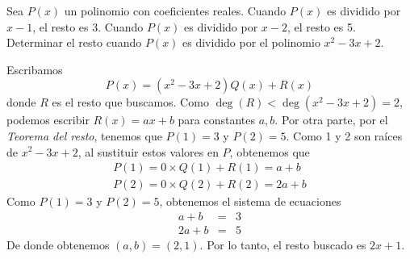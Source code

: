 \begin{section-example.tcb}
    Sea $P(x)$ un polinomio con coeficientes reales.
    Cuando $P(x)$ es dividido por $x - 1$, el resto es 3.
    Cuando $P(x)$ es dividido por $x - 2$, el resto es 5.
    Determinar el resto cuando $P(x)$ es dividido por el polinomio $x^2 - 3x + 2$.
\end{section-example.tcb}
\begin{solution}
    Escribamos
    \[
        P(x) = (x^2 - 3x + 2)Q(x) + R(x)
    \]
    donde $R$ es el resto que buscamos.
    Como $\deg(R) < \deg(x^2 - 3x + 2) =  2$, podemos escribir $R(x) = ax + b$ para constantes $a, b$.
    Por otra parte, por el \textit{Teorema del resto}, tenemos que $P(1) = 3$ y $P(2) = 5$.
    Como 1 y 2 son raíces de $x^2 - 3x + 2$, al sustituir estos valores en $P$, obtenemos que
    \begin{gather*}
        P(1) = 0\times Q(1) + R(1) = a + b\\
        P(2) = 0\times Q(2) + R(2) = 2a + b
    \end{gather*}
    Como $P(1) = 3$ y $P(2) = 5$, obtenemos el sistema de ecuaciones
    \[
        \begin{array}{rcl}
            a + b & =& 3\\
            2a + b & =& 5
        \end{array}
    \]
    De donde obtenemos $(a, b) = (2, 1)$.
    Por lo tanto, el resto buscado es $\boxed{2x + 1}$.
\end{solution}

